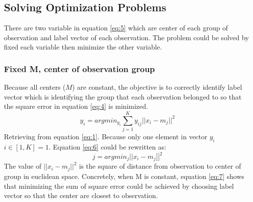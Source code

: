 \documentclass[conference]{IEEEtran}
\begin{document}
\subsection{Solving Optimization Problems}
\indent There are two variable in equation \ref{eq:5} which are center of each group of observation and label vector of each observation. The problem could be solved by fixed each variable then minimize the other variable.
\subsubsection{Fixed M, center of observation group} \label{FixedM}
\indent Because all centers ($M$) are constant, the objective is to correctly identify label vector which is identifying the group that each observation belonged to so that the square error in equation \ref{eq:4} is minimized.
\begin{equation} \label{eq:6}
y_i = argmin_{y_i}\sum_{j=1}^{K}y_{ij}||x_i-m_j||^2
\end{equation}
\indent Retrieving from equation \ref{eq:1}. Because only one element in vector $y_i$ $i\in[1,K]=1$. Equation \ref{eq:6} could be rewritten as:
\begin{equation} \label{eq:7}
j=argmin_{j}||x_i-m_j]]^2
\end{equation}
\indent The value of $||x_i-m_j||^2$ is the square of distance from observation to center of group in euclidean space. Concretely, when M is constant, equation \ref{eq:7} shows that minimizing the sum of square error could be achieved by choosing label vector so that the center are closest to observation.
\end{document}
